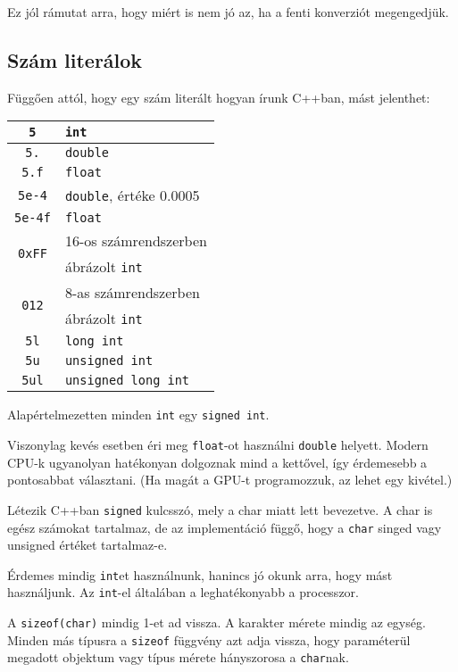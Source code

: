 \documentclass[a4paper,11.5pt,table]{article}
\begin{document}
	Ez jól rámutat arra, hogy miért is nem jó az, ha a fenti konverziót megengedjük.
	\subsection{Szám literálok}
	Függően attól, hogy egy szám literált hogyan írunk C++ban, mást jelenthet:
	\begin{center}
		\setlength{\extrarowheight}{2pt}
		\begin{tabular}{|c|l|}
			\hline
			\texttt{5}						&\texttt{int}\\
			\hline
			\texttt{5.}						&\texttt{double}\\
			\hline
			\texttt{5.f}					&\texttt{float}\\
			\hline
			\texttt{5e-4}					&\texttt{double}, értéke 0.0005\\
			\hline
			\texttt{5e-4f}					&\texttt{float}\\
			\hline
			\multirow{2}{*}{\texttt{0xFF}}	&{16-os számrendszerben}\\
											& ábrázolt \texttt{int}\\
			\hline
			\multirow{2}{*}{\texttt{012}}	&{8-as számrendszerben}\\
											&ábrázolt \texttt{int}\\
			\hline
			\texttt{5l}						&\texttt{long int}\\
			\hline
			\texttt{5u}						&\texttt{unsigned int}\\
			\hline
			\texttt{5ul}					&\texttt{unsigned long int}\\
			\hline
		\end{tabular}
		\end{center}
	\begin{note}
		Alapértelmezetten minden \texttt{int} egy \texttt{signed int}.
	\end{note}
	\begin{note}
		Viszonylag kevés esetben éri meg \texttt{float}-ot használni \texttt{double} helyett. Modern CPU-k ugyanolyan hatékonyan dolgoznak mind a kettővel, így érdemesebb a pontosabbat választani. (Ha magát a GPU-t programozzuk, az lehet egy kivétel.)
	\end{note}
	
	Létezik C++ban \texttt{signed} kulcsszó, mely a char miatt lett bevezetve. A char is egész számokat tartalmaz, de az implementáció függő, hogy a \texttt{char} singed vagy unsigned értéket tartalmaz-e. 
	\begin{note}
		Érdemes mindig \texttt{int}et használnunk, hanincs jó okunk arra, hogy mást használjunk. Az \texttt{int}-el általában a leghatékonyabb a processzor.
	\end{note}
	A \texttt{sizeof(char)} mindig 1-et ad vissza. A karakter mérete mindig az egység. Minden más típusra a \texttt{sizeof} függvény azt adja vissza, hogy paraméterül megadott objektum vagy típus mérete hányszorosa a \texttt{char}nak. 
	
\end{document}
